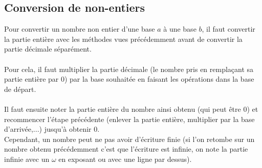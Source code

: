 \documentclass[a4paper,10pt]{book}
\begin{document}
\subsection{Conversion de non-entiers}
Pour convertir un nombre non entier d'une base $a$ à une base $b$, il faut convertir la partie entière avec les méthodes vues précédemment avant de convertir la partie décimale séparément.\\\\
Pour cela, il faut multiplier la partie décimale (le nombre pris en remplaçant sa partie entière par 0) par la base souhaitée en faisant les opérations dans la base de départ.\\\\
Il faut ensuite noter la partie entière du nombre ainsi obtenu (qui peut être 0) et recommencer l'étape précédente (enlever la partie entière, multiplier par la base d'arrivée,...) jusqu'à obtenir 0.\\

Cependant, un nombre peut ne pas avoir d'écriture finie (si l'on retombe sur un nombre obtenu précédemment c'est que l'écriture est infinie, on note la partie infinie avec un $\omega$ en exposant ou avec une ligne par dessus).
\end{document}
